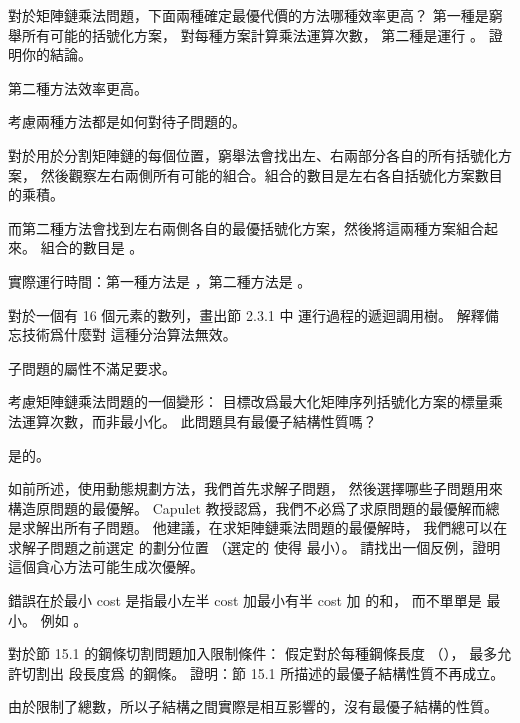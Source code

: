 \startsection[
  title={Elements of dynamic programming},
]

\startEXERCISE
對於矩陣鏈乘法問題，下面兩種確定最優代價的方法哪種效率更高？
第一種是窮舉所有可能的括號化方案，
對每種方案計算乘法運算次數，
第二種是運行 。
證明你的結論。
\stopEXERCISE

\startANSWER
第二種方法效率更高。

考慮兩種方法都是如何對待子問題的。

對於用於分割矩陣鏈的每個位置，窮舉法會找出左、右兩部分各自的所有括號化方案，
然後觀察左右兩側所有可能的組合。組合的數目是左右各自括號化方案數目的乘積。

而第二種方法會找到左右兩側各自的最優括號化方案，然後將這兩種方案組合起來。
組合的數目是 。

實際運行時間：第一種方法是 ，第二種方法是 。
\stopANSWER

\startEXERCISE
對於一個有 16 個元素的數列，畫出節 2.3.1 中  運行過程的遞迴調用樹。
解釋備忘技術爲什麼對  這種分治算法無效。
\stopEXERCISE

\startANSWER
子問題的屬性不滿足要求。
\stopANSWER

\startEXERCISE
考慮矩陣鏈乘法問題的一個變形：
目標改爲最大化矩陣序列括號化方案的標量乘法運算次數，而非最小化。
此問題具有最優子結構性質嗎？
\stopEXERCISE

\startANSWER
是的。
\stopANSWER

\startEXERCISE
如前所述，使用動態規劃方法，我們首先求解子問題，
然後選擇哪些子問題用來構造原問題的最優解。
 Capulet 教授認爲，我們不必爲了求原問題的最優解而總是求解出所有子問題。
他建議，在求矩陣鏈乘法問題的最優解時，
我們總可以在求解子問題{\EMP 之前}選定  的劃分位置 
（選定的  使得  最小）。
請找出一個反例，證明這個貪心方法可能生成次優解。
\stopEXERCISE

\startANSWER
錯誤在於最小 cost 是指最小左半 cost 加最小有半 cost 加  的和，
而不單單是  最小。
例如 \m{[1x1][1x2][2x3]}。
\stopANSWER

\startEXERCISE
對於節 15.1 的鋼條切割問題加入限制條件：
假定對於每種鋼條長度 （），
最多允許切割出  段長度爲  的鋼條。
證明：節 15.1 所描述的最優子結構性質不再成立。
\stopEXERCISE

\startANSWER
由於限制了總數，所以子結構之間實際是相互影響的，沒有最優子結構的性質。
\stopANSWER

